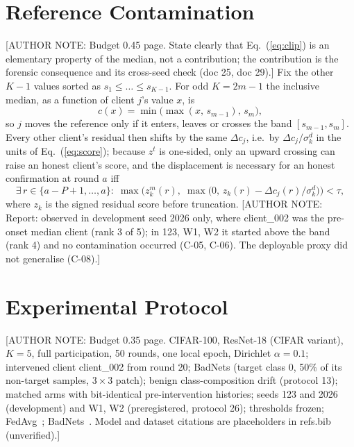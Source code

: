 \documentclass{article}
\newif\ifshownotes \shownotestrue
\newcommand{\authornote}[1]{\ifshownotes{\color{blue}\footnotesize[AUTHOR NOTE: #1]}\fi}
\begin{document}
\section{Reference Contamination}
\label{sec:contamination}
\authornote{Budget 0.45 page. State clearly that Eq.~(\ref{eq:clip}) is an elementary property of the median, not
a contribution; the contribution is the forensic consequence and its cross-seed check (doc 25, doc 29).}
Fix the other $K-1$ values sorted as $s_1\le\dots\le s_{K-1}$. For odd $K=2m-1$ the inclusive median, as a function
of client $j$'s value $x$, is
\begin{equation}
c(x) = \min\!\big(\max(x,\, s_{m-1}),\, s_m\big), \label{eq:clip}
\end{equation}
so $j$ moves the reference only if it enters, leaves or crosses the band $[s_{m-1},s_m]$. Every other client's
residual then shifts by the same $\Delta c_j$, i.e.\ by $\Delta c_j/\sigma^d_k$ in the units of Eq.~(\ref{eq:score});
because $z^t$ is one-sided, only an upward crossing can raise an honest client's score, and the displacement is
necessary for an honest confirmation at round $a$ iff
\begin{equation}
\exists\, r\in\{a-P+1,\dots,a\}:\;\max\!\Big(z^m_k(r),\; \max\big(0,\, z_k(r)-\Delta c_j(r)/\sigma^d_k\big)\Big) < \tau,
\label{eq:necessity}
\end{equation}
where $z_k$ is the signed residual score before truncation. \authornote{Report: observed in development seed 2026
only, where client\_002 was the pre-onset median client (rank 3 of 5); in 123, W1, W2 it started above the band
(rank 4) and no contamination occurred (C-05, C-06). The deployable proxy did not generalise (C-08).}

\section{Experimental Protocol}
\label{sec:setup}
\authornote{Budget 0.35 page. CIFAR-100, ResNet-18 (CIFAR variant), $K=5$, full participation, 50 rounds, one local
epoch, Dirichlet $\alpha=0.1$; intervened client client\_002 from round 20; BadNets (target class 0, 50\% of its
non-target samples, $3\times3$ patch); benign class-composition drift (protocol 13); matched arms with
bit-identical pre-intervention histories; seeds 123 and 2026 (development) and W1, W2 (preregistered,
protocol 26); thresholds frozen; FedAvg~\cite{mcmahan2017fedavg}; BadNets~\cite{gu2019badnets}. Model and dataset
citations are placeholders in refs.bib (unverified).}
\end{document}
